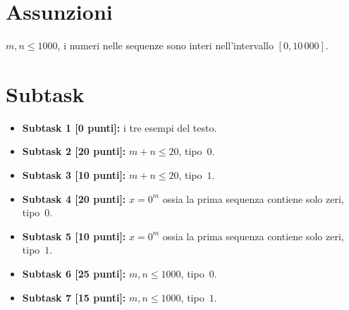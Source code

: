 


\section*{Assunzioni}

$m,n \leq 1000$, i numeri nelle sequenze sono interi nell'intervallo $[0,10\,000]$.

\section*{Subtask}

  \begin{itemize}
    \item \textbf{Subtask 1 [0 punti]:} i tre esempi del testo.
    \item \textbf{Subtask 2 [20 punti]:} $m+n \leq 20$, tipo~$0$.
    \item \textbf{Subtask 3 [10 punti]:} $m+n \leq 20$, tipo~$1$.
    \item \textbf{Subtask 4 [20 punti]:} $x=0^m$ ossia la prima sequenza contiene solo zeri, tipo~$0$.
    \item \textbf{Subtask 5 [10 punti]:} $x=0^m$ ossia la prima sequenza contiene solo zeri, tipo~$1$.
    \item \textbf{Subtask 6 [25 punti]:} $m,n \leq 1000$, tipo~$0$.
    \item \textbf{Subtask 7 [15 punti]:} $m,n \leq 1000$, tipo~$1$.      
  \end{itemize}
  
